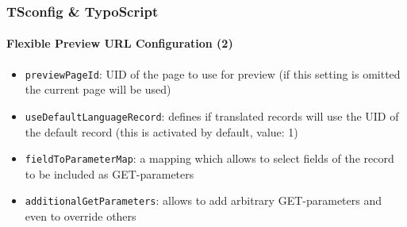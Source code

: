 \begin{frame}[fragile]
	\frametitle{TSconfig \& TypoScript}
	\framesubtitle{Flexible Preview URL Configuration (2)}

	\begin{itemize}
		\item \texttt{previewPageId}:\newline
			\smaller
				UID of the page to use for preview\newline
				(if this setting is omitted the current page will be used)
			\normalsize
		\item \texttt{useDefaultLanguageRecord}:\newline
			\smaller
				defines if translated records will use the UID of the default record\newline
				(this is activated by default, value: 1)
			\normalsize
		\item \texttt{fieldToParameterMap}:\newline
			\smaller
				a mapping which allows to select fields of the record to be included as GET-parameters
			\normalsize
		\item \texttt{additionalGetParameters}:\newline
			\smaller
				allows to add arbitrary GET-parameters and even to override others
			\normalsize
	\end{itemize}

\end{frame}

